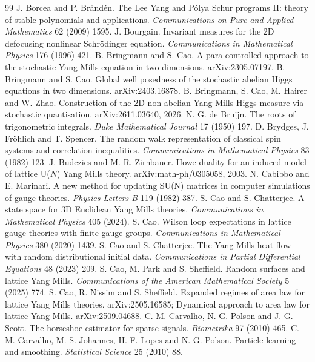\begin{thebibliography}{99}
 J. Borcea and P. Br\"and\'en. The Lee Yang and P\'olya Schur programs II: theory of stable polynomials and applications. \emph{Communications on Pure and Applied Mathematics} 62 (2009) 1595.
 J. Bourgain. Invariant measures for the 2D defocusing nonlinear Schr\"odinger equation. \emph{Communications in Mathematical Physics} 176 (1996) 421.
 B. Bringmann and S. Cao. A para controlled approach to the stochastic Yang Mills equation in two dimensions. arXiv:2305.07197.
 B. Bringmann and S. Cao. Global well posedness of the stochastic abelian Higgs equations in two dimensions. arXiv:2403.16878.
 B. Bringmann, S. Cao, M. Hairer and W. Zhao. Construction of the 2D non abelian Yang Mills Higgs measure via stochastic quantisation. arXiv:2611.03640, 2026.
 N. G. de Bruijn. The roots of trigonometric integrals. \emph{Duke Mathematical Journal} 17 (1950) 197.
 D. Brydges, J. Fr\"ohlich and T. Spencer. The random walk representation of classical spin systems and correlation inequalities. \emph{Communications in Mathematical Physics} 83 (1982) 123.
 J. Budczies and M. R. Zirnbauer. Howe duality for an induced model of lattice U($N$) Yang Mills theory. arXiv:math-ph/0305058, 2003.
 N. Cabibbo and E. Marinari. A new method for updating SU(N) matrices in computer simulations of gauge theories. \emph{Physics Letters B} 119 (1982) 387.
 S. Cao and S. Chatterjee. A state space for 3D Euclidean Yang Mills theories. \emph{Communications in Mathematical Physics} 405 (2024).
 S. Cao. Wilson loop expectations in lattice gauge theories with finite gauge groups. \emph{Communications in Mathematical Physics} 380 (2020) 1439.
 S. Cao and S. Chatterjee. The Yang Mills heat flow with random distributional initial data. \emph{Communications in Partial Differential Equations} 48 (2023) 209.
 S. Cao, M. Park and S. Sheffield. Random surfaces and lattice Yang Mills. \emph{Communications of the American Mathematical Society} 5 (2025) 774.
 S. Cao, R. Nissim and S. Sheffield. Expanded regimes of area law for lattice Yang Mills theories. arXiv:2505.16585; Dynamical approach to area law for lattice Yang Mills. arXiv:2509.04688.
 C. M. Carvalho, N. G. Polson and J. G. Scott. The horseshoe estimator for sparse signals. \emph{Biometrika} 97 (2010) 465.
 C. M. Carvalho, M. S. Johannes, H. F. Lopes and N. G. Polson. Particle learning and smoothing. \emph{Statistical Science} 25 (2010) 88.

\end{thebibliography}
